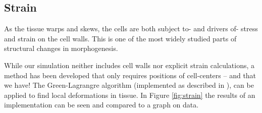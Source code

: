 \subsection{Strain}
As the tissue warps and skews, the cells are both subject to- and drivers of- stress and strain on the cell walls. This is one of the most widely studied parts of structural changes in morphogenesis.

While our simulation neither includes cell walls nor explicit strain calculations, a method has been developed that only requires positions of cell-centers -- and that we have! The Green-Lagrangre algorithm (implemented as described in ), can be applied to find local deformations in tissue. In Figure \ref{fig:strain} the results of an implementation can be seen and compared to a graph on data.

